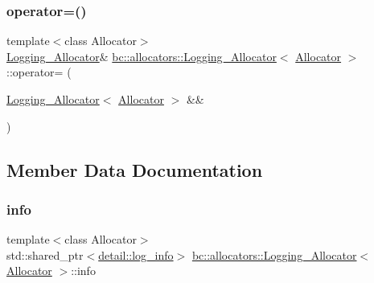 \mbox{\label{structbc_1_1allocators_1_1Logging__Allocator_ae9674620f0f49481649359486c765b00}} 
\subsubsection{\texorpdfstring{operator=()}{operator=()}\hspace{0.1cm}{\footnotesize\ttfamily [2/2]}}
{\footnotesize\ttfamily template$<$class Allocator$>$ \\
\hyperlink{structbc_1_1allocators_1_1Logging__Allocator}{Logging\+\_\+\+Allocator}\& \hyperlink{structbc_1_1allocators_1_1Logging__Allocator}{bc\+::allocators\+::\+Logging\+\_\+\+Allocator}$<$ \hyperlink{classbc_1_1allocators_1_1Allocator}{Allocator} $>$\+::operator= (\begin{DoxyParamCaption}\item[{\hyperlink{structbc_1_1allocators_1_1Logging__Allocator}{Logging\+\_\+\+Allocator}$<$ \hyperlink{classbc_1_1allocators_1_1Allocator}{Allocator} $>$ \&\&}]{ }\end{DoxyParamCaption})\hspace{0.3cm}{\ttfamily [default]}}



\subsection{Member Data Documentation}
\mbox{\label{structbc_1_1allocators_1_1Logging__Allocator_ab32f18018ee9b63af924090cbcc949bc}} 
\subsubsection{\texorpdfstring{info}{info}}
{\footnotesize\ttfamily template$<$class Allocator$>$ \\
std\+::shared\+\_\+ptr$<$\hyperlink{structbc_1_1allocators_1_1detail_1_1log__info}{detail\+::log\+\_\+info}$>$ \hyperlink{structbc_1_1allocators_1_1Logging__Allocator}{bc\+::allocators\+::\+Logging\+\_\+\+Allocator}$<$ \hyperlink{classbc_1_1allocators_1_1Allocator}{Allocator} $>$\+::info}

